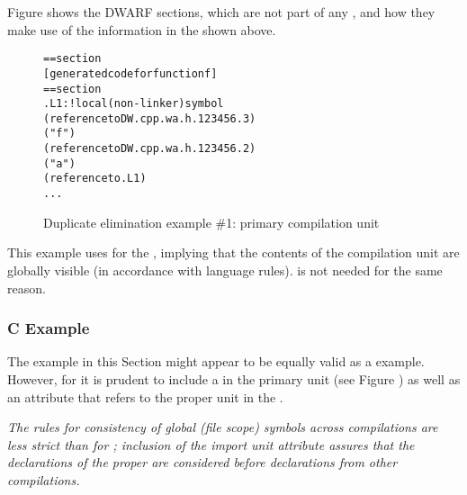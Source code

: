Figure 
shows the  DWARF sections, which are not part of
any , 
and how they make use of the information
in the  shown above.

\begin{figure}
\begin{dwflisting}
\begin{alltt}
== section \dottext{}
    [generated code for function f]
== section \dotdebuginfo{}
    \DWTAGcompileunit
.L1:                           ! local (non-linker) symbol
        \DWTAGreferencetype
            \DWATtype(reference to DW.cpp.wa.h.123456.3)
        \DWTAGsubprogram
            \DWATname("f")
            \DWATtype(reference to DW.cpp.wa.h.123456.2)
            \DWTAGvariable
                \DWATname("a")
                \DWATtype(reference to .L1)
        ...
\end{alltt}
\end{dwflisting}
\caption{Duplicate elimination example \#1: primary compilation unit} 
\label{fig:duplicateeliminationexample1primarycompilationunit}
\end{figure}

This example uses \DWTAGcompileunit{} 
for the ,
implying that the contents of the compilation unit are
globally visible (in accordance with 
 language rules).
\DWTAGpartialunit{} 
is not needed for the same reason.

\subsubsection{C Example}

The  example 
in this Section might appear to be equally
valid as a  example. However, for  
it is prudent to include a \DWTAGimportedunit{}
in the primary unit 
(see Figure )
as well as an \DWATimport{} attribute that refers to the proper unit
in the .

\textit{The  rules for consistency of global (file scope) symbols
across compilations are less strict than for ; inclusion
of the import unit attribute assures that the declarations of
the proper  are considered before declarations
from other compilations.}


